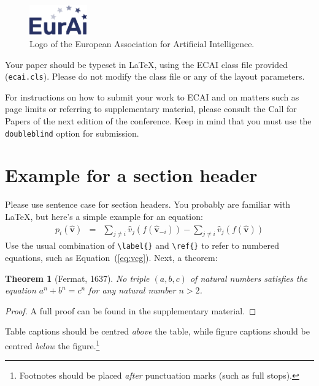 \documentclass{ecai}
\newtheorem{theorem}{Theorem}
\begin{document}
\begin{figure}[h]
\centering
\includegraphics[width=2.5cm]{eurai}
\vspace*{-10pt}
\caption{Logo of the European Association for Artificial Intelligence.}
\vspace*{-15pt}
\label{fig:eurai}
\end{figure}

Your paper should be typeset in \LaTeX, using the ECAI class file 
provided (\texttt{ecai.cls}). Please do not modify the class file or any 
of the layout parameters.

For instructions on how to submit your work to ECAI and on matters such 
as page limits or referring to supplementary material, please consult 
the Call for Papers of the next edition of the conference. Keep in mind
that you must use the \texttt{doubleblind} option for submission.


\section{Example for a section header}

Please use sentence case for section headers. You probably are familiar 
with \LaTeX, but here's a simple example for an equation: 
%
\begin{eqnarray}\label{eq:vcg}
p_i(\boldsymbol{\hat{v}}) & = &
\sum_{j \neq i} \hat{v}_j(f(\boldsymbol{\hat{v}}_{-i})) - 
\sum_{j \neq i} \hat{v}_j(f(\boldsymbol{\hat{v}})) 
\end{eqnarray}
%
Use the usual combination of \verb|\label{}| and \verb|\ref{}| to refer
to numbered equations, such as Equation~(\ref{eq:vcg}). Next, a theorem: 

\begin{theorem}[Fermat, 1637]\label{thm:fermat}
No triple $(a,b,c)$ of natural numbers satisfies the equation 
$a^n + b^n = c^n$ for any natural number $n > 2$.
\end{theorem}

\begin{proof}
A full proof can be found in the supplementary material.
\end{proof}

Table captions should be centred \emph{above} the table, while figure 
captions should be centred \emph{below} the figure.\footnote{Footnotes
should be placed \emph{after} punctuation marks (such as full stops).}
 
\end{document}
